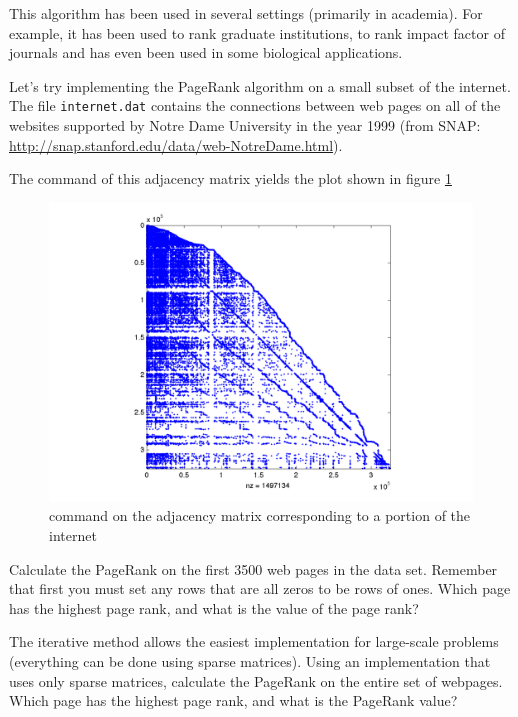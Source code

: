 This algorithm has been used in several settings (primarily in academia).
For example, it has been used to rank graduate institutions, to rank impact factor of journals and has even been used in some biological applications.

Let's try implementing the PageRank algorithm on a small subset of the internet. The file \texttt{internet.dat} contains the connections between web pages on all of the websites supported by Notre Dame University in the year 1999 (from SNAP: \url{http://snap.stanford.edu/data/web-NotreDame.html}).

The  command of this adjacency matrix yields the plot shown in figure \ref{fig:WebSparse}

\begin{figure}
\centering
\includegraphics[scale = .4]{WebSparse.pdf}
\caption{ command on the adjacency matrix corresponding to a portion of the internet}
\label{fig:WebSparse}
\end{figure}

\begin{problem}
Calculate the PageRank on the first 3500 web pages in the data set. Remember that first you must set any rows that are all zeros to be rows of ones. Which page has the highest page rank, and what is the value of the page rank?
\label{prob:pg_calc}
\end{problem}

\begin{problem}
The iterative method allows the easiest implementation for large-scale problems (everything can be done using sparse matrices).
Using an implementation that uses only sparse matrices, calculate the PageRank on the entire set of webpages.
Which page has the highest page rank, and what is the PageRank value?
\end{problem}

